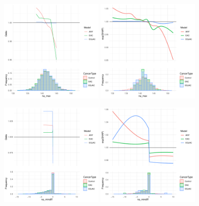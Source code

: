 \documentclass[12pt]{article}
\begin{document}
\begin{figure}[h]
\centering
\includegraphics[width=0.45\textwidth]{pdp/na_max.pdf}
\includegraphics[width=0.45\textwidth]{shap/na_max.pdf}
\end{figure}
\begin{figure}[h]
\centering
\includegraphics[width=0.45\textwidth]{pdp/na_mindiff.pdf}
\includegraphics[width=0.45\textwidth]{shap/na_mindiff.pdf}
\end{figure}
\end{document}
